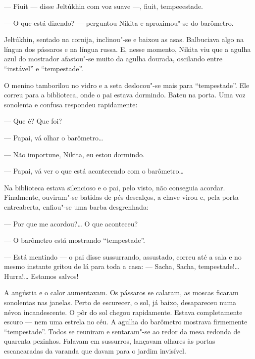 --- Fiuit --- disse Jeltúkhin com voz suave ---, fiuit, tempeeestade.

--- O que está dizendo? --- perguntou Nikita e aproximou"-se do
barômetro.

Jeltúkhin, sentado na cornija, inclinou"-se e baixou as asas. Balbuciava
algo na língua dos pássaros e na língua russa. E, nesse momento, Nikita
viu que a agulha azul do mostrador afastou"-se muito da agulha dourada,
oscilando entre ``instável'' e ``tempestade''.

O menino tamborilou no vidro e a seta deslocou"-se mais para
``tempestade''. Ele correu para a biblioteca, onde o pai estava
dormindo. Bateu na porta. Uma voz sonolenta e confusa respondeu
rapidamente:

--- Que é? Que foi?

--- Papai, vá olhar o barômetro\ldots{}

--- Não importune, Nikita, eu estou dormindo.

--- Papai, vá ver o que está acontecendo com o barômetro\ldots{}

Na biblioteca estava silencioso e o pai, pelo visto, não conseguia
acordar. Finalmente, ouviram"-se batidas de pés descalços, a chave virou
e, pela porta entreaberta, enfiou"-se uma barba desgrenhada:

--- Por que me acordou?\ldots{} O que aconteceu?

--- O barômetro está mostrando ``tempestade''.

--- Está mentindo --- o pai disse sussurrando, assustado, correu até
a sala e no mesmo instante gritou de lá para toda a casa: ---
Sacha, Sacha, tempestade!\ldots{} Hurra!\ldots{} Estamos salvos!

A angústia e o calor aumentavam. Os pássaros se calaram, as moscas
ficaram sonolentas nas janelas. Perto de escurecer, o sol, já baixo,
desapareceu numa névoa incandescente. O pôr do sol chegou rapidamente.
Estava completamente escuro --- nem uma estrela no céu. A agulha do
barômetro mostrava firmemente ``tempestade''. Todos se reuniram e
sentaram"-se ao redor da mesa redonda de quarenta pezinhos. Falavam em
sussurros, lançavam olhares às portas escancaradas da varanda que davam
para o jardim invisível.

